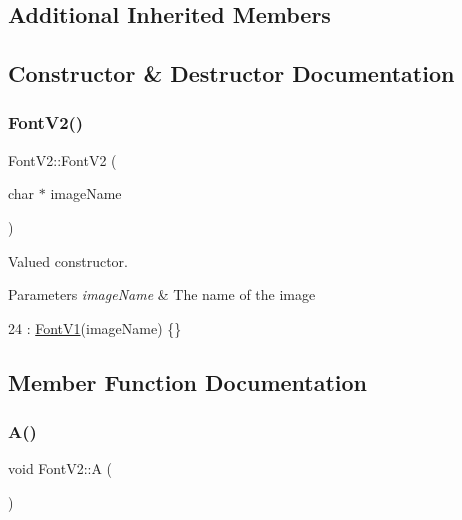 \subsection*{Additional Inherited Members}


\subsection{Constructor \& Destructor Documentation}
\mbox{\label{class_font_v2_aecf9c03af709aa99c23f5c785e798ef4}} 
\subsubsection{\texorpdfstring{Font\+V2()}{FontV2()}}
{\footnotesize\ttfamily Font\+V2\+::\+Font\+V2 (\begin{DoxyParamCaption}\item[{char $\ast$}]{image\+Name }\end{DoxyParamCaption})\hspace{0.3cm}{\ttfamily [inline]}}



Valued constructor. 


\begin{DoxyParams}{Parameters}
{\em image\+Name} & The name of the image \\
\hline
\end{DoxyParams}

\begin{DoxyCode}
24 : \mbox{\hyperlink{class_font_v1_ada1ed699d42679f81146af4bc20db006}{FontV1}}(imageName) \{\}
\end{DoxyCode}


\subsection{Member Function Documentation}
\mbox{\label{class_font_v2_ae1a96e014f4cc9e4447b0a2d947f4a33}} 
\subsubsection{\texorpdfstring{A()}{A()}}
{\footnotesize\ttfamily void Font\+V2\+::A (\begin{DoxyParamCaption}{ }\end{DoxyParamCaption})}



